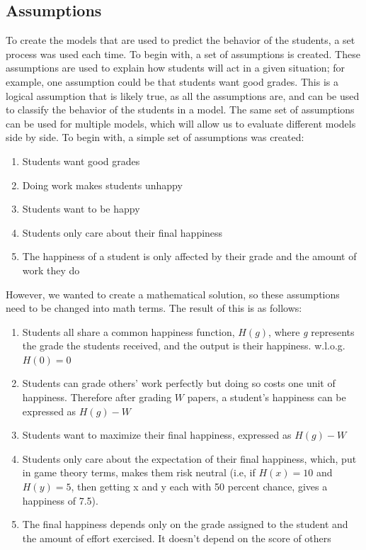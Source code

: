 \documentclass[12pt, Arial]{article}
\begin{document}
\subsection{Assumptions}
To create the models that are used to predict the behavior of the students, a set process was used each time. To begin with, a set of assumptions is created. These assumptions are used to explain how students will act in a given situation; for example, one assumption could be that students want good grades. This is a logical assumption that is likely true, as all the assumptions are, and can be used to classify the behavior of the students in a model. The same set of assumptions can be used for multiple models, which will allow us to evaluate different models side by side. To begin with, a simple set of assumptions was created:
\begin{enumerate}
	\item Students want good grades
 	\item Doing work makes students unhappy
  	\item Students want to be happy
 	\item Students only care about their final happiness
  	\item The happiness of a student is only affected by their grade and the amount of work they do
\end{enumerate}
However, we wanted to create a mathematical solution, so these assumptions need to be changed into math terms. The result of this is as follows:
\begin{enumerate}
  \item Students all share a common happiness function, $H(g)$, where \emph{g} represents the grade the students received, and the output is their happiness. w.l.o.g. $H(0)=0$
  \item Students can grade others' work perfectly but doing so costs one unit of happiness. Therefore after grading $W$ papers, a student's happiness can be expressed as $H(g)-W$
  \item Students want to maximize their final happiness, expressed as $H(g)-W$
  \item Students only care about the expectation of their final happiness, which, put in game theory terms, makes them risk neutral (i.e, if $H(x)=10$ and $H(y)=5$, then getting x and y each with 50 percent chance, gives a happiness of 7.5).
  \item The final happiness depends only on the grade assigned to the student and the amount of effort exercised. It doesn't depend on the score of others
\end{enumerate}
\end{document}
